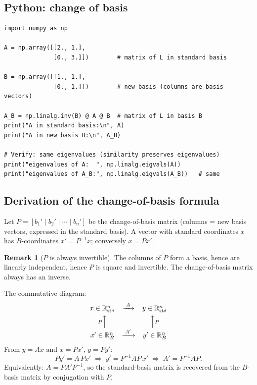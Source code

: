 \documentclass[11pt]{article}
\theoremstyle{definition}
\newtheorem{remark}{Remark}[section]
\theoremstyle{plain}
\begin{document}
\subsection{Python: change of basis}
\begin{lstlisting}
import numpy as np

A = np.array([[2., 1.],
              [0., 3.]])        # matrix of L in standard basis

B = np.array([[1., 1.],
              [0., 1.]])        # new basis (columns are basis vectors)

A_B = np.linalg.inv(B) @ A @ B  # matrix of L in basis B
print("A in standard basis:\n", A)
print("A in new basis B:\n", A_B)

# Verify: same eigenvalues (similarity preserves eigenvalues)
print("eigenvalues of A:  ", np.linalg.eigvals(A))
print("eigenvalues of A_B:", np.linalg.eigvals(A_B))   # same
\end{lstlisting}

\subsection{Derivation of the change-of-basis formula}

Let $P = [b_1' \mid b_2' \mid \cdots \mid b_n']$ be the change-of-basis
matrix (columns = new basis vectors, expressed in the standard basis).
A vector with standard coordinates $x$ has $B$-coordinates
$x' = P^{-1}x$; conversely $x = Px'$.

\begin{remark}[$P$ is always invertible]
  The columns of $P$ form a basis, hence are linearly independent, hence
  $P$ is square and invertible.  The change-of-basis matrix always has an
  inverse.
\end{remark}

\noindent
The commutative diagram:
\[
  \begin{array}{ccc}
    x \in \mathbb{R}^n_{\mathrm{std}} & \xrightarrow{\;A\;} &
    y \in \mathbb{R}^n_{\mathrm{std}} \\[4pt]
    {\scriptstyle P}\Big\uparrow & & \Big\uparrow{\scriptstyle P} \\[4pt]
    x' \in \mathbb{R}^n_{B} & \xrightarrow{\;A'\;} & y' \in \mathbb{R}^n_{B}
  \end{array}
\]
From $y = Ax$ and $x = Px'$, $y = Py'$:
\[
  Py' = A\,Px'
  \;\Longrightarrow\;
  y' = P^{-1}AP\,x'
  \;\Longrightarrow\;
  \boxed{A' = P^{-1}AP.}
\]
Equivalently: $A = PA'P^{-1}$, so the standard-basis matrix is recovered
from the $B$-basis matrix by conjugation with $P$.
\end{document}
